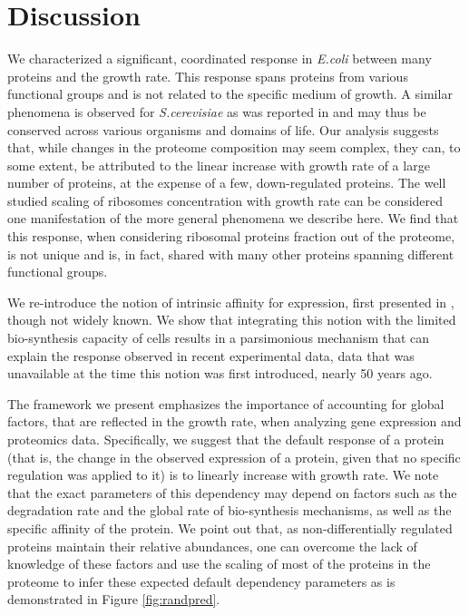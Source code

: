 \section{Discussion}
We characterized a significant, coordinated response in \emph{E.coli} between many proteins and the growth rate.
This response spans proteins from various functional groups and is not related to the specific medium of growth.
A similar phenomena is observed for \emph{S.cerevisiae} as was reported in \cite{Keren2013a} and may thus be conserved across various organisms and domains of life.
Our analysis suggests that, while changes in the proteome composition may seem complex, they can, to some extent, be attributed to the linear increase with growth rate of a large number of proteins, at the expense of a few, down-regulated proteins.
The well studied scaling of ribosomes concentration with growth rate can be considered one manifestation of the more general phenomena we describe here.
We find that this response, when considering ribosomal proteins fraction out of the proteome, is not unique and is, in fact, shared with many other proteins spanning different functional groups.

We re-introduce the notion of intrinsic affinity for expression, first presented in \cite{Maaloe1969}, though not widely known.
We show that integrating this notion with the limited bio-synthesis capacity of cells results in a parsimonious mechanism that can explain the response observed in recent experimental data, data that was unavailable at the time this notion was first introduced, nearly 50 years ago.

The framework we present emphasizes the importance of accounting for global factors, that are reflected in the growth rate, when analyzing gene expression and proteomics data.
Specifically, we suggest that the default response of a protein (that is, the change in the observed expression of a protein, given that no specific regulation was applied to it) is to linearly increase with growth rate.
We note that the exact parameters of this dependency may depend on factors such as the degradation rate and the global rate of bio-synthesis mechanisms, as well as the specific affinity of the protein.
We point out that, as non-differentially regulated proteins maintain their relative abundances, one can overcome the lack of knowledge of these factors and use the scaling of most of the proteins in the proteome to infer these expected default dependency parameters as is demonstrated in Figure \ref{fig:randpred}.

